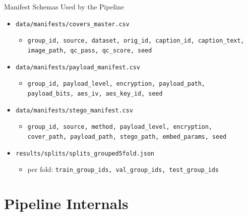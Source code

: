 \documentclass[aspectratio=169,11pt]{beamer}
\begin{document}
\begin{frame}{Manifest Schemas Used by the Pipeline}
\scriptsize
\begin{itemize}
\item \texttt{data/manifests/covers\_master.csv}
\begin{itemize}
\item \texttt{group\_id, source, dataset, orig\_id, caption\_id, caption\_text, image\_path, qc\_pass, qc\_score, seed}
\end{itemize}
\item \texttt{data/manifests/payload\_manifest.csv}
\begin{itemize}
\item \texttt{group\_id, payload\_level, encryption, payload\_path, payload\_bits, aes\_iv, aes\_key\_id, seed}
\end{itemize}
\item \texttt{data/manifests/stego\_manifest.csv}
\begin{itemize}
\item \texttt{group\_id, source, method, payload\_level, encryption, cover\_path, payload\_path, stego\_path, embed\_params, seed}
\end{itemize}
\item \texttt{results/splits/splits\_grouped5fold.json}
\begin{itemize}
\item per fold: \texttt{train\_group\_ids, val\_group\_ids, test\_group\_ids}
\end{itemize}
\end{itemize}
\end{frame}

\section{Pipeline Internals}
\end{document}
